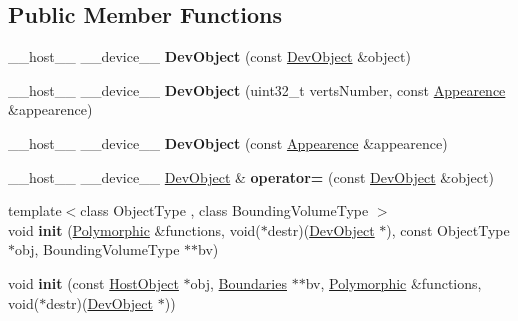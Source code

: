\subsection*{Public Member Functions}
\begin{DoxyCompactItemize}
\item 
\+\_\+\+\_\+host\+\_\+\+\_\+ \+\_\+\+\_\+device\+\_\+\+\_\+ {\bfseries Dev\+Object} (const \hyperlink{class_dev_object}{Dev\+Object} \&object)\hypertarget{class_dev_object_a0eb5ac616858ccb98c7f9d0d6b136e37}{}\label{class_dev_object_a0eb5ac616858ccb98c7f9d0d6b136e37}

\item 
\+\_\+\+\_\+host\+\_\+\+\_\+ \+\_\+\+\_\+device\+\_\+\+\_\+ {\bfseries Dev\+Object} (uint32\+\_\+t verts\+Number, const \hyperlink{struct_appearence}{Appearence} \&appearence)\hypertarget{class_dev_object_a8a2f767cf3ef43bd298777d0c832a020}{}\label{class_dev_object_a8a2f767cf3ef43bd298777d0c832a020}

\item 
\+\_\+\+\_\+host\+\_\+\+\_\+ \+\_\+\+\_\+device\+\_\+\+\_\+ {\bfseries Dev\+Object} (const \hyperlink{struct_appearence}{Appearence} \&appearence)\hypertarget{class_dev_object_ac209dfe2089d0bc1b581d8437d9957a9}{}\label{class_dev_object_ac209dfe2089d0bc1b581d8437d9957a9}

\item 
\+\_\+\+\_\+host\+\_\+\+\_\+ \+\_\+\+\_\+device\+\_\+\+\_\+ \hyperlink{class_dev_object}{Dev\+Object} \& {\bfseries operator=} (const \hyperlink{class_dev_object}{Dev\+Object} \&object)\hypertarget{class_dev_object_a2ebee898cc6649365e984ae1b778a4f1}{}\label{class_dev_object_a2ebee898cc6649365e984ae1b778a4f1}

\item 
{\footnotesize template$<$class Object\+Type , class Bounding\+Volume\+Type $>$ }\\void {\bfseries init} (\hyperlink{struct_polymorphic}{Polymorphic} \&functions, void($\ast$destr)(\hyperlink{class_dev_object}{Dev\+Object} $\ast$), const Object\+Type $\ast$obj, Bounding\+Volume\+Type $\ast$$\ast$bv)\hypertarget{class_dev_object_a4eba0664c29dc32891f074b664e7d52d}{}\label{class_dev_object_a4eba0664c29dc32891f074b664e7d52d}

\item 
void {\bfseries init} (const \hyperlink{class_host_object}{Host\+Object} $\ast$obj, \hyperlink{class_boundaries}{Boundaries} $\ast$$\ast$bv, \hyperlink{struct_polymorphic}{Polymorphic} \&functions, void($\ast$destr)(\hyperlink{class_dev_object}{Dev\+Object} $\ast$))\hypertarget{class_dev_object_a71a495db8891a7a000e70fbd70876f9c}{}\label{class_dev_object_a71a495db8891a7a000e70fbd70876f9c}


\end{DoxyCompactItemize}
